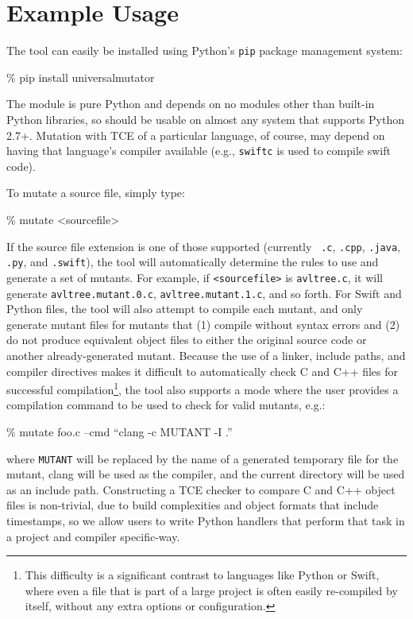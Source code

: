 \section{Example Usage}

The tool can easily be installed using Python's {\tt pip} package management system:

\begin{code}
\% pip install universalmutator
\end{code}

The module is pure Python and depends on no modules other than
built-in Python libraries, so should be usable on almost any system
that supports Python 2.7+.  Mutation with TCE of a particular
language, of course, may depend on having that language's compiler
available (e.g., {\tt swiftc} is used to compile swift code).

To mutate a source file, simply type:


\begin{code}
\% mutate <sourcefile>
\end{code}

If the source file extension is one of those supported (currently {\tt
  .c}, {\tt .cpp}, {\tt .java}, {\tt .py}, and {\tt .swift}), the tool
will automatically determine the rules to use and generate a set of
mutants.  For example, if {\tt <sourcefile>} is {\tt avltree.c}, it
will generate {\tt avltree.mutant.0.c}, {\tt avltree.mutant.1.c}, and
so forth.  For Swift and Python files, the tool will also attempt to
compile each mutant, and only generate mutant files for mutants that
(1) compile without syntax errors and (2) do not produce equivalent
object files to either the original source code or another
already-generated mutant.  Because the use of a linker, include paths, and
compiler directives makes it difficult to automatically check C and
C++ files for successful compilation\footnote{This difficulty is a
  significant contrast to languages
  like Python or Swift, where even a file that is part of a large
  project is often easily re-compiled by itself, without any extra
  options or configuration.}, the tool also supports a mode where the
user provides a compilation command to be used to check for valid
mutants, e.g.:


\begin{code}
\% mutate foo.c --cmd ``clang -c MUTANT -I .''
\end{code}

\noindent where {\tt MUTANT} will be replaced by the name of a
generated temporary file for the mutant, clang will be used as the
compiler, and the current directory will be used as an include path.  Constructing a TCE checker
to compare C and C++ object files is non-trivial, due to build
complexities and object formats that include timestamps, so we allow
users to write Python handlers that perform that task in a project and
compiler specific-way.

